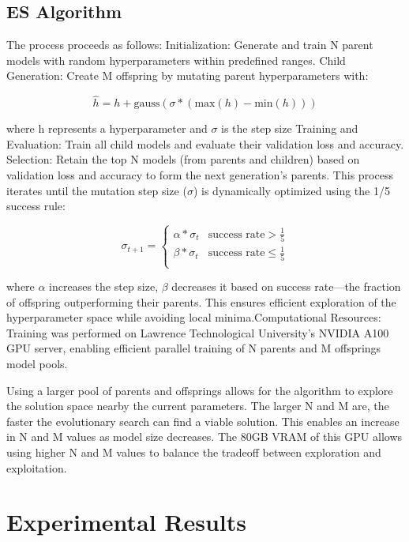 \documentclass[conference]{IEEEtran}
\begin{document}
\subsection{ES Algorithm}
The process proceeds as follows:
Initialization: Generate and train N parent models with random hyperparameters within predefined ranges.
Child Generation: Create M offspring by mutating parent hyperparameters with:

\begin{equation}
    \hat{h} = h + \text{gauss}(\sigma * (\text{max}(h) - \text{min}(h)))
\end{equation}


where h represents a hyperparameter and $\sigma$ is the step size
Training and Evaluation: Train all child models and evaluate their validation loss and accuracy.
Selection: Retain the top N models (from parents and children) based on validation loss and accuracy to form the next generation's parents.
This process iterates until the mutation step size ($\sigma$) is dynamically optimized using the 1/5 success rule:

\begin{equation}
    \sigma_{t+1} = \left\{
    \begin{array}{ll}
        \alpha * \sigma_t & \text{success rate} > \frac{1}{5}    \\
        \beta * \sigma_t  & \text{success rate} \leq \frac{1}{5} \\
    \end{array}
    \right.
\end{equation}


where $\alpha$ increases the step size, $\beta$ decreases it based on success rate—the fraction of offspring outperforming their parents. This ensures efficient exploration of the hyperparameter space while avoiding local minima.Computational Resources: Training was performed on Lawrence Technological University’s NVIDIA A100 GPU server, enabling efficient parallel training of N parents and M offsprings model pools.

Using a larger pool of parents and offsprings allows for the algorithm to explore the solution space nearby the current parameters. The larger N and M are, the faster the evolutionary search can find a viable solution. This enables an increase in N and M values as model size decreases. The 80GB VRAM of this GPU allows using higher N and M values to balance the tradeoff between exploration and exploitation.


\section{Experimental Results}
\end{document}
